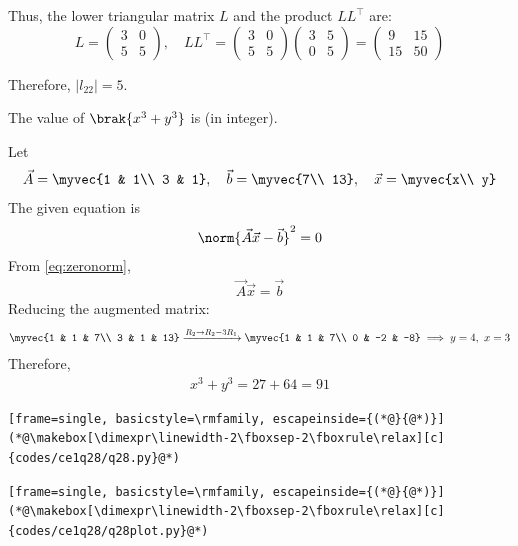 \begin{enumerate}[label=\thesubsection.\arabic*, ref=\thesubsection.\theenumi, itemsep=0pt, leftmargin=*]
Thus, the lower triangular matrix $L$ and the product $LL^{\top}$ are:
\begin{equation}
    L = \begin{pmatrix} 3 & 0 \\ 5 & 5 \end{pmatrix}, \quad LL^{\top} = \begin{pmatrix} 3 & 0 \\ 5 & 5 \end{pmatrix} \begin{pmatrix} 3 & 5 \\ 0 & 5 \end{pmatrix} = \begin{pmatrix} 9 & 15 \\ 15 & 50 \end{pmatrix} \label{eq:1.2.8.5}
\end{equation}

Therefore, $|l_{22}| = 5$.

The value of $\brak{x^3 + y^3}$ is \underline{\hspace{2cm}} (in integer). \gate

\solution Let
\begin{align}
\vec{A} = \myvec{1 & 1\\ 3 & 1},\quad \vec{b} = \myvec{7\\ 13},\quad \vec{x} = \myvec{x\\ y}
\end{align}
The given equation is
\begin{align}
\norm{\vec{A}\vec{x} - \vec{b}}^2 = 0
\end{align}
From \eqref{eq:zeronorm},
\begin{align}
\vec{A}\vec{x} = \vec{b}
\end{align}
Reducing the augmented matrix:
\begin{align}
\myvec{1 & 1 & 7\\ 3 & 1 & 13} \xrightarrow{R_2\to R_2 - 3R_1} \myvec{1 & 1 & 7\\ 0 & -2 & -8} \implies y = 4,\ x = 3
\end{align}
Therefore,
\begin{align}
x^3 + y^3 = 27 + 64 = 91
\end{align}
\begin{lstlisting}[frame=single, basicstyle=\rmfamily, escapeinside={(*@}{@*)}]
(*@\makebox[\dimexpr\linewidth-2\fboxsep-2\fboxrule\relax][c]{codes/ce1q28/q28.py}@*)
\end{lstlisting}
\begin{lstlisting}[frame=single, basicstyle=\rmfamily, escapeinside={(*@}{@*)}]
(*@\makebox[\dimexpr\linewidth-2\fboxsep-2\fboxrule\relax][c]{codes/ce1q28/q28plot.py}@*)
\end{lstlisting}


\end{enumerate}
